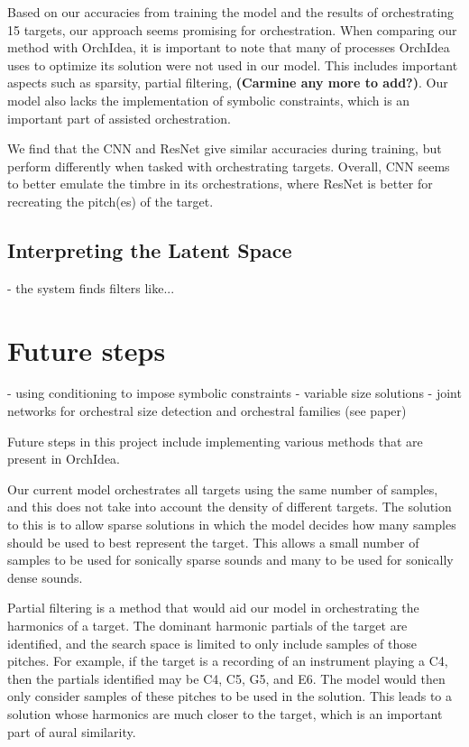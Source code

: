 \documentclass{article}
\begin{document}
Based on our accuracies from training the model and the results of orchestrating 15 targets, our approach seems promising for orchestration. When comparing our method with OrchIdea, it is important to note that many of processes OrchIdea uses to optimize its solution were not used in our model. This includes important aspects such as sparsity, partial filtering, \textbf{(Carmine any more to add?)}. Our model also lacks the implementation of symbolic constraints, which is an important part of assisted orchestration.

We find that the CNN and ResNet give similar accuracies during training, but perform differently when tasked with orchestrating targets. Overall, CNN seems to better emulate the timbre in its orchestrations, where ResNet is better for recreating the pitch(es) of the target. 

\subsection{Interpreting the Latent Space}
- the system finds filters like...

\section{Future steps}
- using conditioning to impose symbolic constraints
- variable size solutions
- joint networks for orchestral size detection and orchestral families (see paper)

Future steps in this project include implementing various methods that are present in OrchIdea. 

Our current model orchestrates all targets using the same number of samples, and this does not take into account the density of different targets. The solution to this is to allow sparse solutions in which the model decides how many samples should be used to best represent the target. This allows a small number of samples to be used for sonically sparse sounds and many to be used for sonically dense sounds. 

Partial filtering is a method that would aid our model in orchestrating the harmonics of a target. The dominant harmonic partials of the target are identified, and the search space is limited to only include samples of those pitches. For example, if the target is a recording of an instrument playing a C4, then the partials identified may be C4, C5, G5, and E6. The model would then only consider samples of these pitches to be used in the solution. This leads to a solution whose harmonics are much closer to the target, which is an important part of aural similarity.
\end{document}
